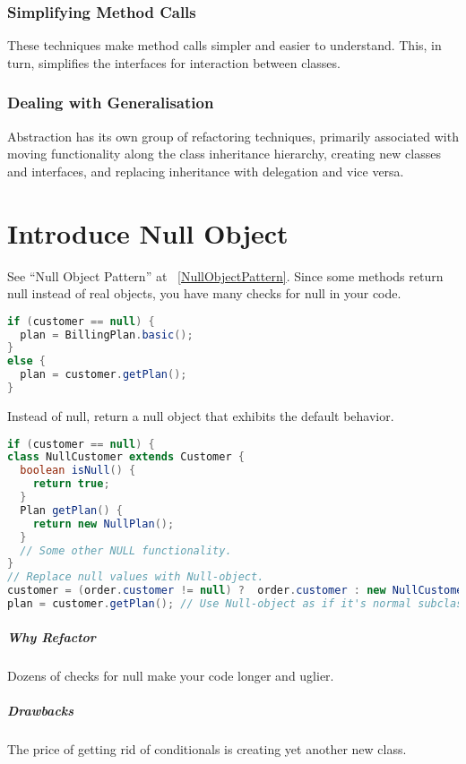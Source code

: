 \documentclass{book}
\begin{document}
\subsection{Simplifying Method Calls}

These techniques make method calls simpler and easier to understand. This, in turn, simplifies the interfaces for interaction between classes.

\subsection{Dealing with Generalisation}

Abstraction has its own group of refactoring techniques, primarily associated with moving functionality along the class inheritance hierarchy,
creating new classes and interfaces, and replacing inheritance with delegation and vice versa.

\chapter{Introduce Null Object}\label{rfINO}
See ``Null Object Pattern'' at ~\ref{NullObjectPattern}. Since some methods return null instead of real objects, you have many checks for null in your code.
\begin{lstlisting}[caption={Problem}, language=Java]
if (customer == null) {
  plan = BillingPlan.basic();
}
else {
  plan = customer.getPlan();
}
\end{lstlisting}

Instead of null, return a null object that exhibits the default behavior.
\begin{lstlisting}[caption={Solution}, language=Java]
if (customer == null) {
class NullCustomer extends Customer {
  boolean isNull() {
    return true;
  }
  Plan getPlan() {
    return new NullPlan();
  }
  // Some other NULL functionality.
}
// Replace null values with Null-object.
customer = (order.customer != null) ?  order.customer : new NullCustomer();
plan = customer.getPlan(); // Use Null-object as if it's normal subclass.
\end{lstlisting}
\paragraph{Why Refactor}
Dozens of checks for null make your code longer and uglier.
\paragraph{Drawbacks}
    The price of getting rid of conditionals is creating yet another new class.
\end{document}
